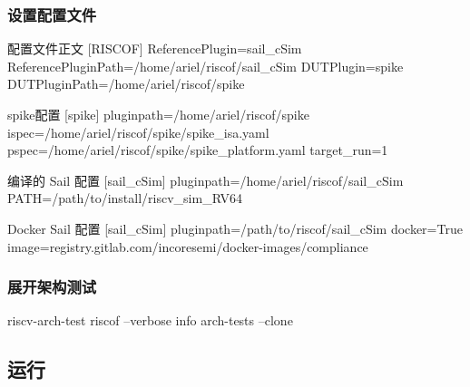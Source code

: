 \documentclass[xcolor=table,dvipsnames,svgnames,aspectratio=169]{ctexbeamer}
\begin{document}
\begin{frame}
  \frametitle{设置配置文件}
  \begin{codeblock}{配置文件正文}
[RISCOF]
ReferencePlugin=sail_cSim
ReferencePluginPath=/home/ariel/riscof/sail_cSim
DUTPlugin=spike
DUTPluginPath=/home/ariel/riscof/spike
  \end{codeblock}
  \newpage
  \begin{codeblock}{spike配置}
[spike]
pluginpath=/home/ariel/riscof/spike
ispec=/home/ariel/riscof/spike/spike_isa.yaml
pspec=/home/ariel/riscof/spike/spike_platform.yaml
target_run=1
  \end{codeblock}
  \newpage
\begin{codeblock}{编译的 Sail 配置}
[sail_cSim]
pluginpath=/home/ariel/riscof/sail_cSim
PATH=/path/to/install/riscv_sim_RV64
  \end{codeblock}
  \begin{codeblock}{Docker Sail 配置}
[sail_cSim]
pluginpath=/path/to/riscof/sail_cSim
docker=True
image=registry.gitlab.com/incoresemi/docker-images/compliance
  \end{codeblock}
  
\end{frame}

\begin{frame}[fragile]
  \frametitle{展开架构测试}

  \begin{codeblock}[language=bash]{riscv-arch-test}
riscof --verbose info arch-tests --clone
  \end{codeblock}

\end{frame}

\subsection{运行}




\end{document}

